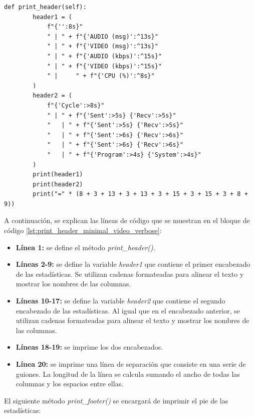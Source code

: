 \begin{lstlisting}[style=pythonstyle, caption={Método print\_header() de \textit{Minimal\_Video\_verbose}}, label={lst:print_header_minimal_video_verbose}]
    def print_header(self):
        header1 = (
            f"{'':8s}"
            " | " + f"{'AUDIO (msg)':^13s}"
            " | " + f"{'VIDEO (msg)':^13s}"
            " | " + f"{'AUDIO (kbps)':^15s}"
            " | " + f"{'VIDEO (kbps)':^15s}"
            " |     " + f"{'CPU (%)':^8s}"
        )
        header2 = (
            f"{'Cycle':>8s}"
            " | " + f"{'Sent':>5s} {'Recv':>5s}"
            "   | " + f"{'Sent':>5s} {'Recv':>5s}"
            "   | " + f"{'Sent':>6s} {'Recv':>6s}"
            "   | " + f"{'Sent':>6s} {'Recv':>6s}"
            "   | " + f"{'Program':>4s} {'System':>4s}"
        )
        print(header1)
        print(header2)
        print("=" * (8 + 3 + 13 + 3 + 13 + 3 + 15 + 3 + 15 + 3 + 8 + 9))
\end{lstlisting}
\vspace{\baselineskip}

A continuación, se explican las líneas de código que se muestran en el bloque de código \ref{lst:print_header_minimal_video_verbose}:
\begin{itemize}
    \item \textbf{Línea 1:} se define el método \textit{print\_header()}.
    \item \textbf{Líneas 2-9:} se define la variable \textit{header1} que contiene el primer encabezado de las estadísticas. Se utilizan cadenas formateadas para alinear el texto y mostrar los nombres de las columnas.
    \item \textbf{Líneas 10-17:} se define la variable \textit{header2} que contiene el segundo encabezado de las estadísticas. Al igual que en el encabezado anterior, se utilizan cadenas formateadas para alinear el texto y mostrar los nombres de las columnas.
    \item \textbf{Líneas 18-19:} se imprime los dos encabezados.
    \item \textbf{Línea 20:} se imprime una línea de separación que consiste en una serie de guiones. La longitud de la línea se calcula sumando el ancho de todas las columnas y los espacios entre ellas.
\end{itemize}

\vspace{\baselineskip}

El siguiente método \textit{print\_footer()} se encargará de imprimir el pie de las estadísticas:

